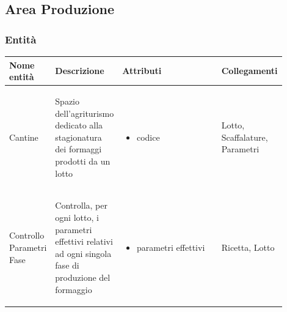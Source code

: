 \documentclass[12pt,a4paper]{article}
\begin{document}
\subsection{Area Produzione}
\subsubsection{Entità}
\label{Produzione Entita}
\begin{center}
\setlength{\extrarowheight}{1.5pt}
\begin{longtable}{|p{0.14\linewidth}|p{0.20\linewidth}|p{0.36\linewidth}|p{0.20\linewidth}|}
\hline 
\textbf{Nome entità} 	& \textbf{Descrizione} & \textbf{Attributi} & \textbf{Collegamenti}\\ 


    
\hline
Cantine				 	& \begin{flushleft}\vspace{-15pt} Spazio dell'agriturismo dedicato alla stagionatura dei formaggi prodotti da un lotto \end{flushleft}
					& \begin{itemize}
						\setlength{\itemindent}{-1em}
						\vspace{-25pt}
						\setlength\itemsep{-0.25em}
						\item codice
					\end{itemize}
					& \begin{flushleft}\vspace{-25pt} Lotto, Scaffalature, Parametri \end{flushleft} \\ 

\hline
Controllo Parametri Fase				 	& \begin{flushleft}\vspace{-25pt} Controlla, per ogni lotto, i parametri effettivi relativi ad ogni singola fase di produzione del formaggio \end{flushleft}
					& \begin{itemize}
						\setlength{\itemindent}{-1em}
						\vspace{-25pt}
						\setlength\itemsep{-0.25em}
						\item parametri effettivi
					\end{itemize}
					& \begin{flushleft}\vspace{-25pt} Ricetta, Lotto \end{flushleft} \\ 


\end{longtable}
\end{center}
\end{document}
